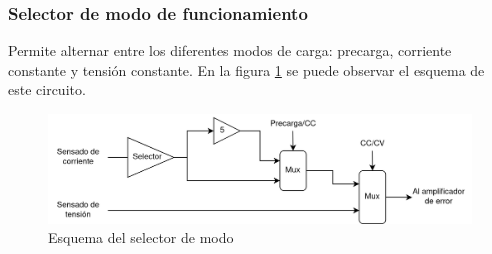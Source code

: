 

\subsubsection{Selector de modo de funcionamiento}

Permite alternar entre los diferentes modos de carga: precarga, corriente constante y tensión constante. 
En la figura \ref{fig:esquema_selector} se puede observar el esquema de este circuito.

\begin{figure}[H]
    \centering
    \includegraphics[width=\textwidth]{images/selector.png}
    \caption{Esquema del selector de modo}
    \label{fig:esquema_selector}
\end{figure}

